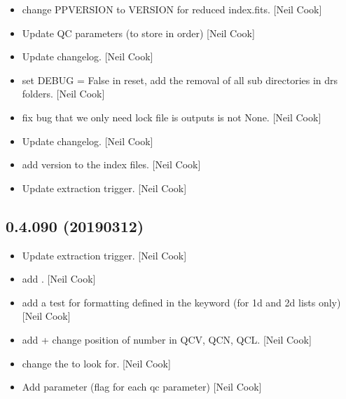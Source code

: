 \documentclass[a4paper,10pt,english]{report}
\begin{document}
\begin{itemize}
\item {} 
 \sphinxhyphen{} change PPVERSION to VERSION for reduced index.fits.
{[}Neil Cook{]}

\item {} 
Update QC parameters (to store in order) {[}Neil Cook{]}

\item {} 
Update changelog. {[}Neil Cook{]}

\item {} 
 \sphinxhyphen{} set DEBUG = False in reset, add the removal of all sub\sphinxhyphen{}
directories in drs folders. {[}Neil Cook{]}

\item {} 
 \sphinxhyphen{} fix bug that we only need lock file is outputs is
not None. {[}Neil Cook{]}

\item {} 
Update changelog. {[}Neil Cook{]}

\item {} 
 \sphinxhyphen{} add version to the index files. {[}Neil Cook{]}

\item {} 
Update extraction trigger. {[}Neil Cook{]}

\end{itemize}


\subsection{0.4.090 (2019\sphinxhyphen{}03\sphinxhyphen{}12)}
\label{\detokenize{misc/changelog:id189}}\begin{itemize}
\item {} 
Update extraction trigger. {[}Neil Cook{]}

\item {} 
 \sphinxhyphen{} add . {[}Neil Cook{]}

\item {} 
 \sphinxhyphen{} add a test for formatting defined in the keyword (for
1d and 2d lists only) {[}Neil Cook{]}

\item {} 
 \sphinxhyphen{} add  + change position of number in
QCV, QCN, QCL. {[}Neil Cook{]}

\item {} 
 \sphinxhyphen{} change the  to look for. {[}Neil Cook{]}

\item {} 
Add  parameter (flag for each qc parameter) {[}Neil Cook{]}

\end{itemize}
\end{document}
